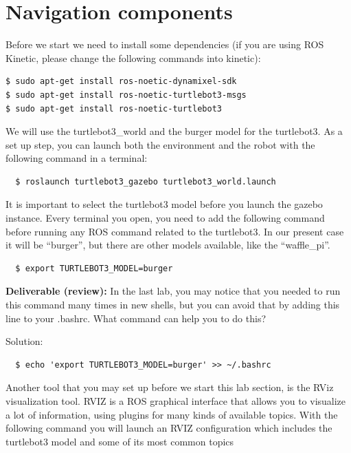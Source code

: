 \documentclass[12pt]{article}
\begin{document}
	\MakeScribeTop





 

\section {Navigation components}
Before we start we need to install some dependencies (if you are using ROS Kinetic, please change the following commands into kinetic):


\begin{verbatim}
$ sudo apt-get install ros-noetic-dynamixel-sdk
$ sudo apt-get install ros-noetic-turtlebot3-msgs
$ sudo apt-get install ros-noetic-turtlebot3
\end{verbatim}

We will use the turtlebot3\_world and the burger model for the turtlebot3. As a set up step, you can launch both the environment and the robot with the following command in a terminal:

\begin{verbatim}
  $ roslaunch turtlebot3_gazebo turtlebot3_world.launch
\end{verbatim}

It is important to select the turtlebot3 model before you launch the gazebo instance. Every terminal you open, you need to add the following command before running any ROS command related to the turtlebot3. In our present case it will be “burger”, but there are other models available, like the “waffle\_pi”.
\begin{verbatim}
  $ export TURTLEBOT3_MODEL=burger
\end{verbatim}

\textbf{Deliverable (review):} In the last lab, you may notice that you needed to run this command many times in new shells, but you can avoid that by adding this line to your .bashrc. What command can help you to do this?

Solution: 
\begin{verbatim}
  $ echo 'export TURTLEBOT3_MODEL=burger' >> ~/.bashrc
\end{verbatim}

Another tool that you may set up before we start this lab section, is the RViz visualization tool. RVIZ is a ROS graphical interface that allows you to visualize a lot of information, using plugins for many kinds of available topics. With the following command you will launch an RVIZ configuration which includes the turtlebot3 model and some of its most common topics
\end{document}
